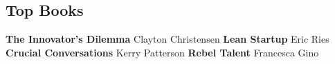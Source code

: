 \documentclass[]{friggeri-cv}
\begin{document}
\begin{aside}
  \section{Top Books}
\textbf{The Innovator's Dilemma} Clayton Christensen \vspace{1.8mm}
\textbf{Lean Startup} Eric Ries \vspace{1.8mm}
\textbf{Crucial Conversations} Kerry Patterson \vspace{1.8mm}
\textbf{Rebel Talent} Francesca Gino \vspace{1.8mm}
~
\end{aside}
\end{document}
